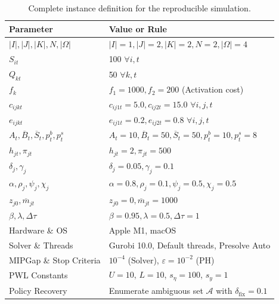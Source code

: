 \documentclass[11pt,a4paper]{article}
\begin{document}
\begin{table}[ht]\small
\centering
\caption{Complete instance definition for the reproducible simulation.}
\begin{tabular}{ll}
\toprule
\textbf{Parameter} & \textbf{Value or Rule} \\
\midrule
$|I|, |J|, |K|, N, |\Omega|$ & $|I|=1, |J|=2, |K|=2, N=2, |\Omega|=4$ \\
$S_{it}$ & 100 $\forall i, t$ \\
$Q_{kt}$ & 50 $\forall k, t$ \\
$f_k$ & $f_1=1000, f_2=200$ (Activation cost) \\
$c_{ijkt}$ & $c_{ij1t}=5.0, c_{ij2t}=15.0$ $\forall i, j, t$ \\
$e_{ijkt}$ & $e_{ij1t}=0.2, e_{ij2t}=0.8$ $\forall i, j, t$ \\
$A_t, \overline B_t, \overline S_t, p_t^b, p_t^s$ & $A_t=10, \overline B_t=50, \overline S_t=50, p_t^b=10, p_t^s=8$ \\
$h_{jt}, \pi_{jt}$ & $h_{jt}=2, \pi_{jt}=500$ \\
$\delta_j, \gamma_j$ & $\delta_j=0.05, \gamma_j=0.1$ \\
$\alpha, \rho_j, \psi_j, \chi_j$ & $\alpha=0.8, \rho_j=0.1, \psi_j=0.5, \chi_j=0.5$ \\
$z_{j0}, \overline m_{jt}$ & $z_{j0}=0, \overline m_{jt}=1000$ \\
$\beta, \lambda, \Delta\tau$ & $\beta=0.95, \lambda=0.5, \Delta\tau=1$ \\
Hardware \& OS & Apple M1, macOS \\
Solver \& Threads & Gurobi 10.0, Default threads, Presolve Auto \\
MIPGap \& Stop Criteria & $10^{-4}$ (Solver), $\varepsilon=10^{-2}$ (PH) \\
PWL Constants & $U=10$, $L=10$, $s_\eta=100$, $s_y=1$ \\
Policy Recovery & Enumerate ambiguous set $\mathcal{A}$ with $\delta_{\mathrm{fix}} = 0.1$ \\
\bottomrule
\end{tabular}
\label{tab:instance_def}
\end{table}
\end{document}
